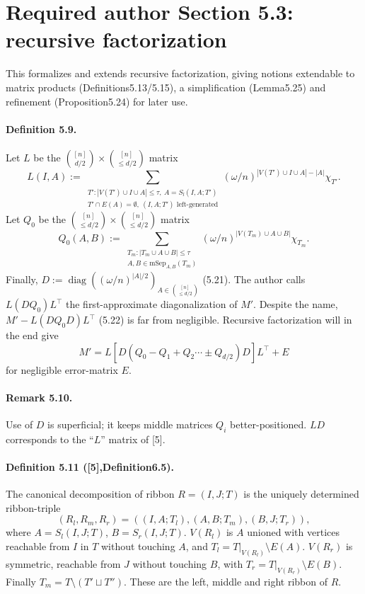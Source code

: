 \section*{Required author Section 5.3: recursive factorization}
This formalizes and extends recursive factorization, giving notions extendable to matrix products (Definitions5.13/5.15), a simplification (Lemma5.25) and refinement (Proposition5.24) for later use.
\paragraph{Definition 5.9.} Let $L$ be the $\binom{[n]}{d/2}\times\binom{[n]}{\le d/2}$ matrix
\[L(I,A):=\sum_{\substack{T':|V(T')\cup I\cup A|\le\tau,\ A=S_l(I,A;T')\\T'\cap E(A)=\emptyset,\ (I,A;T')\text{ left-generated}}}(\omega/n)^{|V(T')\cup I\cup A|-|A|}\chi_{T'}.\tag{5.19}\]
Let $Q_0$ be the $\binom{[n]}{\le d/2}\times\binom{[n]}{\le d/2}$ matrix
\[Q_0(A,B):=\sum_{\substack{T_m:|T_m\cup A\cup B|\le\tau\\A,B\in\mathrm{mSep}_{A,B}(T_m)}}(\omega/n)^{|V(T_m)\cup A\cup B|}\chi_{T_m}.\tag{5.20}\]
Finally, $D:=\operatorname{diag}((\omega/n)^{|A|/2})_{A\in\binom{[n]}{\le d/2}}$ (5.21). The author calls $L(DQ_0)L^\top$ the first-approximate diagonalization of $M'$. Despite the name, $M'-L(DQ_0D)L^\top$ (5.22) is far from negligible. Recursive factorization will in the end give
\[M'=L[D(Q_0-Q_1+Q_2\cdots\pm Q_{d/2})D]L^\top+E\tag{5.23}\]
for negligible error-matrix $E$.
\paragraph{Remark 5.10.} Use of $D$ is superficial; it keeps middle matrices $Q_i$ better-positioned. $LD$ corresponds to the ``$L$'' matrix of [5].
\paragraph{Definition 5.11 ([5],Definition6.5).} The canonical decomposition of ribbon $R=(I,J;T)$ is the uniquely determined ribbon-triple
\[(R_l,R_m,R_r)=((I,A;T_l),(A,B;T_m),(B,J;T_r)),\]
where $A=S_l(I,J;T)$, $B=S_r(I,J;T)$. $V(R_l)$ is $A$ unioned with vertices reachable from $I$ in $T$ without touching $A$, and $T_l=T|_{V(R_l)}\setminus E(A)$. $V(R_r)$ is symmetric, reachable from $J$ without touching $B$, with $T_r=T|_{V(R_r)}\setminus E(B)$. Finally $T_m=T\setminus(T'\sqcup T'')$. These are the left, middle and right ribbon of $R$.
